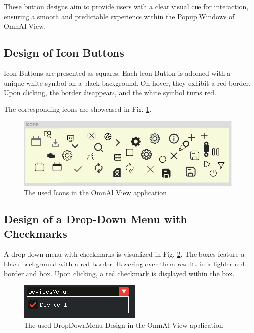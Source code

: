 \documentclass[]{scrreprt}
\begin{document}
These button designs aim to provide users with a clear visual cue for interaction, ensuring a smooth and predictable experience within the Popup Windows of OmnAI View.


\subsection{Design of Icon Buttons}


Icon Buttons are presented as squares. Each Icon Button is adorned with a unique white symbol on a black background. On hover, they exhibit a red border. Upon clicking, the border disappears, and the white symbol turns red.


The corresponding icons are showcased in Fig. \ref{fig: IconImages}.


\begin{figure}
    \includegraphics[width=.7\textwidth]{assets/pictures/Icons.png}
    \caption[]{The used Icons in the OmnAI View application}
    \label{fig: IconImages}
\end{figure}


\subsection{Design of a Drop-Down Menu with Checkmarks}


A drop-down menu with checkmarks is visualized in Fig. \ref{fig: DragandDropwithCheckmarks}. The boxes feature a black background with a red border. Hovering over them results in a lighter red border and box. Upon clicking, a red checkmark is displayed within the box.


\begin{figure}
    \includegraphics[width=.5\textwidth]{assets/pictures/DropDownMenu.png}
    \caption[]{The used DropDownMenu Design in the OmnAI View application}
    \label{fig: DragandDropwithCheckmarks}
\end{figure}
\end{document}
